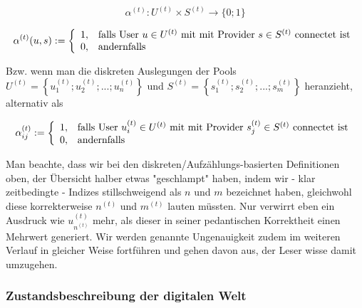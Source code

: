 \begin{Def}\label{defKoeff}

\begin{equation*}
  \alpha^{(t)} : U^{(t)} \times S^{(t)} \rightarrow \{0; 1\} 
\end{equation*}

\[
\alpha^{(t)}(u, s):=\left\{%
\begin{array}{ll}
    1, & \hbox{falls User $u \in U^{(t)}$ mit mit Provider $s \in S^{(t)}$ connectet ist} \\
    0, & \hbox{andernfalls} \\
\end{array}%
\right.
\]

\vspace{1cm}

Bzw. wenn man die diskreten Auslegungen der Pools $U^{(t)} = \left\{ u^{(t)}_1; u^{(t)}_2;...; u^{(t)}_{n} \right\}$ und $S^{(t)} = \left\{ s^{(t)}_1; s^{(t)}_2;...; s^{(t)}_{m} \right\}$ heranzieht, alternativ als

\[
\alpha^{(t)}_{ij}:=\left\{%
\begin{array}{ll}
    1, & \hbox{falls User $u^{(t)}_i \in U^{(t)}$ mit mit Provider $s^{(t)}_j \in S^{(t)}$ connectet ist} \\
    0, & \hbox{andernfalls} \\
\end{array}%
\right.
\]

\end{Def}

\vspace{0.6cm}

Man beachte, dass wir bei den diskreten/Aufzählungs-basierten Definitionen oben, der Übersicht halber etwas "geschlampt" haben, indem wir - klar zeitbedingte - Indizes stillschweigend als $n$ und $m$ bezeichnet haben, gleichwohl diese korrekterweise $n^{(t)}$ und $m^{(t)}$ lauten müssten. Nur verwirrt eben ein Ausdruck wie $u^{(t)}_{n^{(t)}}$ mehr, als dieser in seiner pedantischen Korrektheit einen Mehrwert generiert. Wir werden genannte Ungenauigkeit zudem im weiteren Verlauf in gleicher Weise fortführen und gehen davon aus, der Leser wisse damit umzugehen. 

\vspace{0.3cm}



\subsubsection{Zustandsbeschreibung der digitalen Welt}
\label{sec:eco_zahlen_zustand_digitalisierung}

